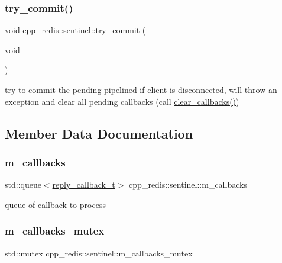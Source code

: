 \subsubsection{\texorpdfstring{try\+\_\+commit()}{try\_commit()}}
{\footnotesize\ttfamily void cpp\+\_\+redis\+::sentinel\+::try\+\_\+commit (\begin{DoxyParamCaption}\item[{void}]{ }\end{DoxyParamCaption})\hspace{0.3cm}{\ttfamily [private]}}

try to commit the pending pipelined if client is disconnected, will throw an exception and clear all pending callbacks (call \hyperlink{classcpp__redis_1_1sentinel_a4f5364cf618fefe34ced591d698f5caf}{clear\+\_\+callbacks()}) 

\subsection{Member Data Documentation}
\mbox{\label{classcpp__redis_1_1sentinel_a12ce1c0a082ffdd718f0cc1d41d2339f}} 
\subsubsection{\texorpdfstring{m\+\_\+callbacks}{m\_callbacks}}
{\footnotesize\ttfamily std\+::queue$<$\hyperlink{classcpp__redis_1_1sentinel_ae1a150ff8787208c47414397a061c9a7}{reply\+\_\+callback\+\_\+t}$>$ cpp\+\_\+redis\+::sentinel\+::m\+\_\+callbacks\hspace{0.3cm}{\ttfamily [private]}}

queue of callback to process \mbox{\label{classcpp__redis_1_1sentinel_a65f034fd5c96887ffa36383dd264b250}} 
\subsubsection{\texorpdfstring{m\+\_\+callbacks\+\_\+mutex}{m\_callbacks\_mutex}}
{\footnotesize\ttfamily std\+::mutex cpp\+\_\+redis\+::sentinel\+::m\+\_\+callbacks\+\_\+mutex\hspace{0.3cm}{\ttfamily [private]}}

